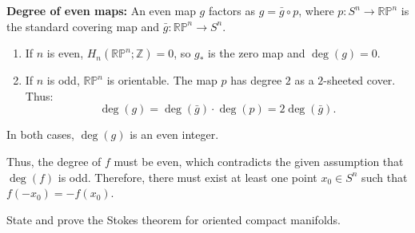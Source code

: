 \begin{solution}
\textbf{Degree of even maps:}
An even map $g$ factors as $g = \bar{g} \circ p$, where $p: S^n \to \mathbb{RP}^n$ is the standard covering map and $\bar{g}: \mathbb{RP}^n \to S^n$.
\begin{enumerate}
    \item If $n$ is even, $H_n(\mathbb{RP}^n; \mathbb{Z}) = 0$, so $g_*$ is the zero map and $\deg(g) = 0$.
    \item If $n$ is odd, $\mathbb{RP}^n$ is orientable. The map $p$ has degree $2$ as a $2$-sheeted cover. Thus:
    \[ \deg(g) = \deg(\bar{g}) \cdot \deg(p) = 2 \deg(\bar{g}). \]
\end{enumerate}
In both cases, $\deg(g)$ is an even integer.

Thus, the degree of $f$ must be even, which contradicts the given assumption that $\deg(f)$ is odd. Therefore, there must exist at least one point $x_0 \in S^n$ such that $f(-x_0) = -f(x_0)$.
\end{solution}

\clearpage

\begin{exercise}
\label{geometry:2012:11}
State and prove the Stokes theorem for oriented compact manifolds.
\end{exercise}

